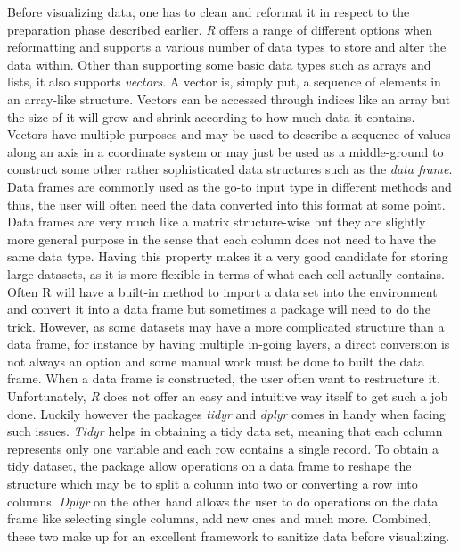 \documentclass[Report.tex]{subfiles}
\begin{document}
 Before visualizing data, one has to clean and reformat it in respect to the preparation phase described earlier. \emph{R} offers a range of different options when reformatting and supports a various number of data  types to store and alter the data within. Other than supporting some basic data types such as arrays and lists, it also supports \emph{vectors}. A vector is, simply put, a sequence of elements in an array-like structure. Vectors can be accessed through indices like an array but the size of it will grow and shrink according to how much data it contains. Vectors have multiple purposes and may be used to describe a sequence of values along an axis in a coordinate system or may just be used as a middle-ground to construct some other rather sophisticated data structures such as the \emph{data frame}. Data frames are commonly used as the go-to input type in different methods and thus, the user will often need the data converted into this format at some point. Data frames are very much like a matrix structure-wise but they are slightly more general purpose in the sense that each column does not need to have the same data type. Having this property makes it a very good candidate for storing large datasets, as it is more flexible in terms of what each cell actually contains. Often R will have a built-in method to import a data set into the environment and convert it into a data frame but sometimes a package will need to do the trick. However, as some datasets may have a more complicated structure than a data frame, for instance by having multiple in-going layers, a direct conversion is not always an option and some manual work must be done to built the data frame. When a data frame is constructed, the user often want to restructure it. Unfortunately, \emph{R} does not offer an easy and intuitive way itself to get such a job done. Luckily however the packages \emph{tidyr} and  \emph{dplyr} comes in handy when facing such issues. \emph{Tidyr} helps in obtaining a tidy data set, meaning that each column represents only one variable and each row contains a single record. To obtain a tidy dataset, the package allow operations on a data frame to reshape the structure which may be to split a column into two or converting a row into columns. \emph{Dplyr} on the other hand allows the user to do operations on the data frame like selecting single columns, add new ones and much more. Combined, these two make up for an excellent framework to sanitize data before visualizing.\\
 
\end{document}
